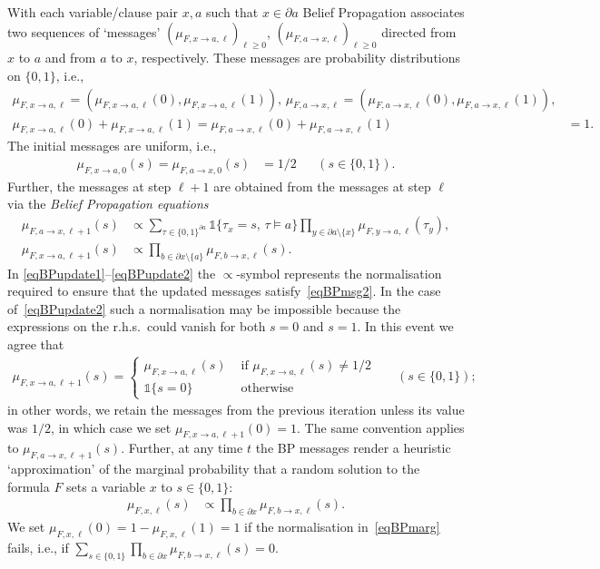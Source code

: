 \documentclass[10pt,reqno]{amsart}
\numberwithin{equation}{section}
\newcommand{\vecone}{\mathbb{1}}
\begin{document}
With each variable/clause pair $x,a$ such that $x\in\partial a$ Belief Propagation associates two sequences of `messages' $(\mu_{F,x\to a,\ell})_{\ell\geq0}$, $(\mu_{F,a\to x,\ell})_{\ell\geq0}$ directed from $x$ to $a$ and from $a$ to $x$, respectively.
These messages are probability distributions on $\{0,1\}$, i.e., 
\begin{align}\label{eqBPmsg1}
	\mu_{F,x\to a,\ell}=(\mu_{F,x\to a,\ell}(0),\mu_{F,x\to a,\ell}(1)),\,\mu_{F,a\to x,\ell}=(\mu_{F,a\to x,\ell}(0),\mu_{F,a\to x,\ell}(1)),\\
	\mu_{F,x\to a,\ell}(0)+\mu_{F,x\to a,\ell}(1)=\mu_{F,a\to x,\ell}(0)+\mu_{F,a\to x,\ell}(1)&=1.\label{eqBPmsg2}
	\end{align}
The initial messages are uniform, i.e.,
\begin{align}\label{eqBPupdate0}
	\mu_{F,x\to a,0}(s)=\mu_{F,a\to x,0}(s)&=1/2&&(s\in\{0,1\}).
\end{align}
Further, the messages at step $\ell+1$ are obtained from the messages at step $\ell$ via the {\em Belief Propagation equations}
\begin{align}\label{eqBPupdate1}
	\mu_{F,a\to x,\ell+1}(s)&\propto\sum_{\tau\in\{0,1\}^{\partial a}}\vecone\{\tau_{x}=s,\,\tau\models a\}\prod_{y\in\partial a\setminus\{x\}}\mu_{F,y\to a,\ell}(\tau_y),\\
\mu_{F,x\to a,\ell+1}(s)&\propto\prod_{b\in\partial x\setminus\{a\}}\mu_{F,b\to x,\ell}(s).\label{eqBPupdate2}
\end{align}
In \eqref{eqBPupdate1}--\eqref{eqBPupdate2} the $\propto$-symbol represents the normalisation required to ensure that the updated messages satisfy~\eqref{eqBPmsg2}.
In the case of~\eqref{eqBPupdate2} such a normalisation may be impossible because the expressions on the r.h.s.\ could vanish for both $s=0$ and $s=1$.
In this event we agree that
	\begin{align*}
		\mu_{F,x\to a,\ell+1}(s)=\begin{cases}
			\mu_{F,x\to a,\ell}(s)&\mbox{ if }\mu_{F,x\to a,\ell}(s)\neq1/2\\
			\vecone\{s=0\}&\mbox{ otherwise}
		\end{cases}&&(s\in\{0,1\});
	\end{align*}
in other words, we retain the messages from the previous iteration unless its value was $1/2$, in which case we set $\mu_{F,x\to a,\ell+1}(0)=1$. 
The same convention applies to $\mu_{F,a\to x,\ell+1}(s)$. 
Further, at any time $t$ the BP messages render a heuristic `approximation' of the marginal probability that a random solution to the formula $F$ sets a variable $x$ to $s\in\{0,1\}$:
\begin{align}\label{eqBPmarg}
	\mu_{F,x,\ell}(s)&\propto\prod_{b\in\partial x}\mu_{F,b\to x,\ell}(s).
\end{align}
We set $\mu_{F,x,\ell}(0)=1-\mu_{F,x,\ell}(1)=1$ if the normalisation in~\eqref{eqBPmarg} fails, i.e., if $\sum_{s\in\{0,1\}}\prod_{b\in\partial x}\mu_{F,b\to x,\ell}(s)=0$.
\end{document}
